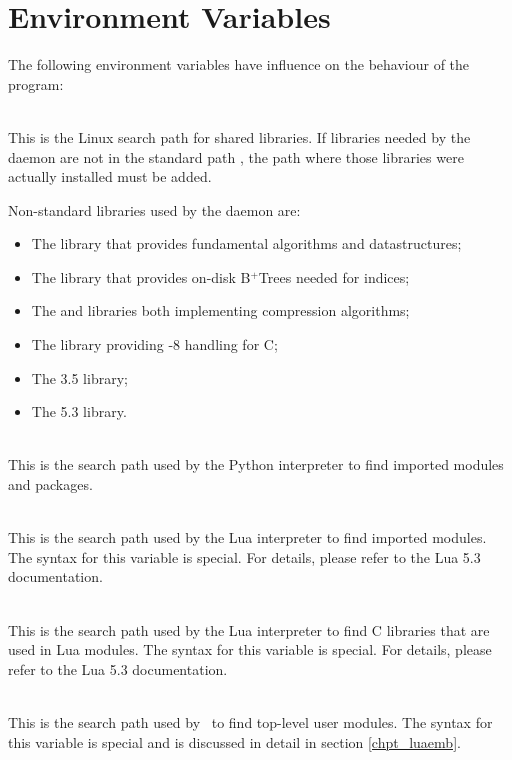 \section{Environment Variables}
The following environment variables have influence
on the behaviour of the program:

\\
This is the Linux search path for shared libraries.
If libraries needed by the daemon are not in
the standard path , the path
where those libraries were actually installed
must be added.

\begin{minipage}{\textwidth}
Non-standard libraries used by the daemon are:
\begin{itemize}
\item The  library that provides
      fundamental algorithms and datastructures;
\item The  library that provides
      on-disk B$^+$Trees needed for indices;
\item The  and  libraries
      both implementing compression algorithms;
\item The  library providing -8
      handling for C;
\item The  3.5 library;
\item The  5.3 library.
\end{itemize}
\end{minipage}

\\
This is the search path used by the Python interpreter
to find imported modules and packages.

\\
This is the search path used by the Lua interpreter
to find imported modules.
The syntax for this variable is special.
For details, please refer to the Lua 5.3 documentation.

\\
This is the search path used by the Lua interpreter
to find C libraries that are used in Lua modules.
The syntax for this variable is special.
For details, please refer to the Lua 5.3 documentation.

\\
This is the search path used by \nowdb\ to find top-level
user modules. The syntax for this variable is special
and is discussed in detail in section \ref{chpt_luaemb}.

